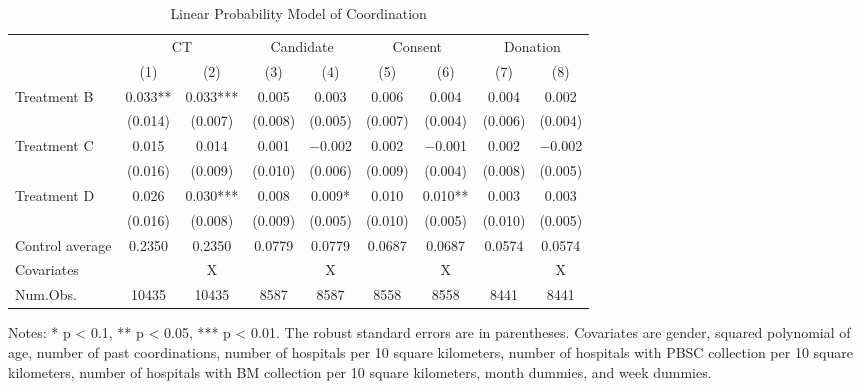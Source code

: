\documentclass[
]{article}
\begin{document}
\begin{table}

\caption{\label{tab:est-full-coordination}Linear Probability Model of Coordination}
\centering
\fontsize{9}{11}\selectfont
\begin{threeparttable}
\begin{tabular}[t]{lcccccccc}
\toprule
\multicolumn{1}{c}{ } & \multicolumn{2}{c}{CT} & \multicolumn{2}{c}{Candidate} & \multicolumn{2}{c}{Consent} & \multicolumn{2}{c}{Donation} \\
\cmidrule(l{3pt}r{3pt}){2-3} \cmidrule(l{3pt}r{3pt}){4-5} \cmidrule(l{3pt}r{3pt}){6-7} \cmidrule(l{3pt}r{3pt}){8-9}
  & (1) & (2) & (3) & (4) & (5) & (6) & (7) & (8)\\
\midrule
Treatment B & \num{0.033}** & \num{0.033}*** & \num{0.005} & \num{0.003} & \num{0.006} & \num{0.004} & \num{0.004} & \num{0.002}\\
 & (\num{0.014}) & (\num{0.007}) & (\num{0.008}) & (\num{0.005}) & (\num{0.007}) & (\num{0.004}) & (\num{0.006}) & (\num{0.004})\\
Treatment C & \num{0.015} & \num{0.014} & \num{0.001} & \num{-0.002} & \num{0.002} & \num{-0.001} & \num{0.002} & \num{-0.002}\\
 & (\num{0.016}) & (\num{0.009}) & (\num{0.010}) & (\num{0.006}) & (\num{0.009}) & (\num{0.004}) & (\num{0.008}) & (\num{0.005})\\
Treatment D & \num{0.026} & \num{0.030}*** & \num{0.008} & \num{0.009}* & \num{0.010} & \num{0.010}** & \num{0.003} & \num{0.003}\\
 & (\num{0.016}) & (\num{0.008}) & (\num{0.009}) & (\num{0.005}) & (\num{0.010}) & (\num{0.005}) & (\num{0.010}) & (\num{0.005})\\
\midrule
Control average & 0.2350 & 0.2350 & 0.0779 & 0.0779 & 0.0687 & 0.0687 & 0.0574 & 0.0574\\
Covariates &  & X &  & X &  & X &  & X\\
Num.Obs. & \num{10435} & \num{10435} & \num{8587} & \num{8587} & \num{8558} & \num{8558} & \num{8441} & \num{8441}\\
\bottomrule
\end{tabular}
\begin{tablenotes}
\item Notes: * p < 0.1, ** p < 0.05, *** p < 0.01. The robust standard errors are in parentheses. Covariates are gender, squared polynomial of age, number of past coordinations, number of hospitals per 10 square kilometers, number of hospitals with PBSC collection per 10 square kilometers, number of hospitals with BM collection per 10 square kilometers, month dummies, and week dummies.
\end{tablenotes}
\end{threeparttable}
\end{table}
\end{document}
